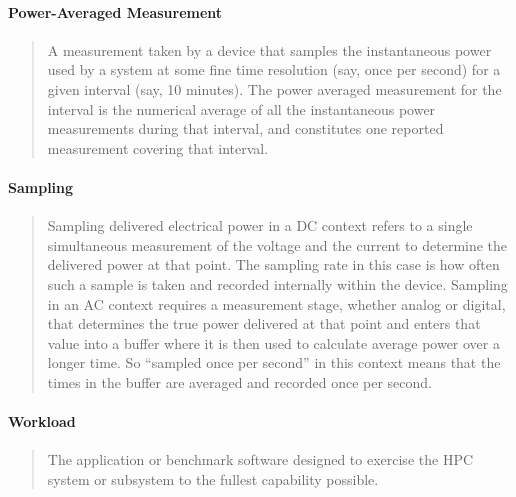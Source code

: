 \paragraph*{Power-Averaged Measurement}
\begin{quote}
A measurement taken by a device that samples the instantaneous power used by a system at some fine
time resolution (say, once per second) for a given interval (say, 10 minutes).  The power averaged
measurement for the interval is the numerical average of all the instantaneous power measurements
during that interval, and constitutes one reported measurement covering that interval.
\end{quote}

\paragraph*{Sampling}
\begin{quote}
Sampling delivered electrical power in a DC context refers to a single simultaneous measurement
of the voltage and the current to determine the delivered power at that point.  The sampling
rate in this case is how often such a sample is taken and recorded internally within the device.
Sampling in an AC context requires a measurement stage, whether analog or digital, that determines
the true power delivered at that point and enters that value into a buffer where it is then used
to calculate average power over a longer time.  So ``sampled once per second'' in this context
means that the times in the buffer are averaged and recorded once per second.
\end{quote}

\paragraph*{Workload}
\begin{quote}
The application or benchmark software designed to exercise the HPC system or subsystem to
the fullest capability possible.
\end{quote}

